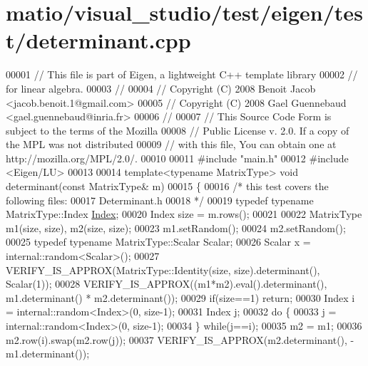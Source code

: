 \hypertarget{matio_2visual__studio_2test_2eigen_2test_2determinant_8cpp_source}{}\section{matio/visual\+\_\+studio/test/eigen/test/determinant.cpp}
\label{matio_2visual__studio_2test_2eigen_2test_2determinant_8cpp_source}

\begin{DoxyCode}
00001 \textcolor{comment}{// This file is part of Eigen, a lightweight C++ template library}
00002 \textcolor{comment}{// for linear algebra.}
00003 \textcolor{comment}{//}
00004 \textcolor{comment}{// Copyright (C) 2008 Benoit Jacob <jacob.benoit.1@gmail.com>}
00005 \textcolor{comment}{// Copyright (C) 2008 Gael Guennebaud <gael.guennebaud@inria.fr>}
00006 \textcolor{comment}{//}
00007 \textcolor{comment}{// This Source Code Form is subject to the terms of the Mozilla}
00008 \textcolor{comment}{// Public License v. 2.0. If a copy of the MPL was not distributed}
00009 \textcolor{comment}{// with this file, You can obtain one at http://mozilla.org/MPL/2.0/.}
00010 
00011 \textcolor{preprocessor}{#include "main.h"}
00012 \textcolor{preprocessor}{#include <Eigen/LU>}
00013 
00014 \textcolor{keyword}{template}<\textcolor{keyword}{typename} MatrixType> \textcolor{keywordtype}{void} determinant(\textcolor{keyword}{const} MatrixType& m)
00015 \{
00016   \textcolor{comment}{/* this test covers the following files:}
00017 \textcolor{comment}{     Determinant.h}
00018 \textcolor{comment}{  */}
00019   \textcolor{keyword}{typedef} \textcolor{keyword}{typename} MatrixType::Index \hyperlink{namespace_eigen_a62e77e0933482dafde8fe197d9a2cfde}{Index};
00020   Index size = m.rows();
00021 
00022   MatrixType m1(size, size), m2(size, size);
00023   m1.setRandom();
00024   m2.setRandom();
00025   \textcolor{keyword}{typedef} \textcolor{keyword}{typename} MatrixType::Scalar Scalar;
00026   Scalar x = internal::random<Scalar>();
00027   VERIFY\_IS\_APPROX(MatrixType::Identity(size, size).determinant(), Scalar(1));
00028   VERIFY\_IS\_APPROX((m1*m2).eval().determinant(), m1.determinant() * m2.determinant());
00029   \textcolor{keywordflow}{if}(size==1) \textcolor{keywordflow}{return};
00030   Index i = internal::random<Index>(0, size-1);
00031   Index j;
00032   \textcolor{keywordflow}{do} \{
00033     j = internal::random<Index>(0, size-1);
00034   \} \textcolor{keywordflow}{while}(j==i);
00035   m2 = m1;
00036   m2.row(i).swap(m2.row(j));
00037   VERIFY\_IS\_APPROX(m2.determinant(), -m1.determinant());

\end{DoxyCode}
